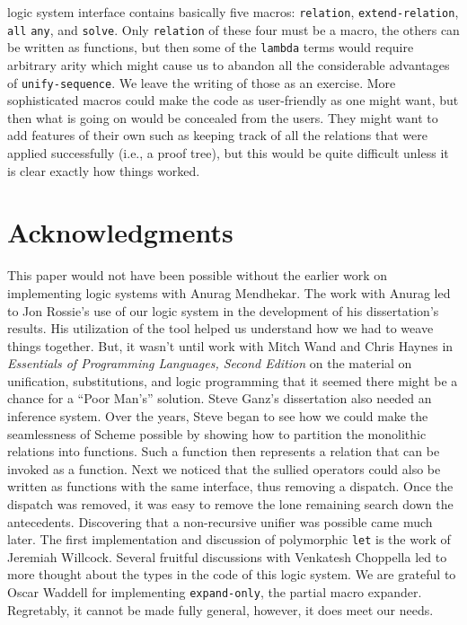 logic system interface contains basically five macros:
\texttt{relation}, \texttt{extend-relation}, \texttt{all}
\texttt{any}, and \texttt{solve}.  Only \texttt{relation} of these
four must be a macro, the others can be written as functions, but then
some of the \texttt{lambda} terms would require arbitrary arity which
might cause us to abandon all the considerable advantages of
\texttt{unify-sequence}.  We leave the writing of those as an
exercise.  More sophisticated macros could make the code as
user-friendly as one might want, but then what is going on would be
concealed from the users.  They might want to add features of their
own such as keeping track of all the relations that were applied
successfully (i.e., a proof tree), but this would be quite difficult
unless it is clear exactly how things worked.

\section{Acknowledgments}

This paper would not have been possible without the earlier work on
implementing logic systems with Anurag Mendhekar.  The work with
Anurag led to Jon Rossie's use of our logic system in the development
of his dissertation's results.  His utilization of the tool helped us
understand how we had to weave things together.  But, it wasn't until
work with Mitch Wand and Chris Haynes in \emph{Essentials of
Programming Languages, Second Edition} on the material on unification,
substitutions, and logic programming that it seemed there might be a
chance for a ``Poor Man's'' solution.  Steve Ganz's dissertation also
needed an inference system.  Over the years, Steve began to see how we
could make the seamlessness of Scheme possible by showing how to
partition the monolithic relations into functions.  Such a function
then represents a relation that can be invoked as a function.  Next we
noticed that the sullied operators could also be written as functions
with the same interface, thus removing a dispatch.  Once the dispatch
was removed, it was easy to remove the lone remaining search down the
antecedents.  Discovering that a non-recursive unifier was possible
came much later.  The first implementation and discussion of
polymorphic \texttt{let} is the work of Jeremiah Willcock.  Several
fruitful discussions with Venkatesh Choppella led to more thought
about the types in the code of this logic system.  We are grateful to
Oscar Waddell for implementing \texttt{expand-only}, the partial macro
expander.  Regretably, it cannot be made fully general, however, it
does meet our needs.




